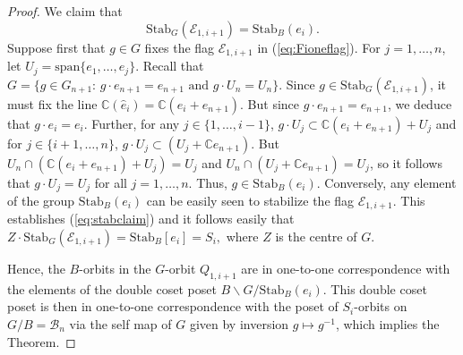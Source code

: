 \documentclass[12pt]{amsart}
\numberwithin{equation}{section}
\newcommand{\C}{\mbox{${\mathbb C}$}}
\newcommand{\B}{\mathcal{B}}
\newcommand{\F}{\mathcal{F}}
\begin{document}
\begin{proof}
We claim that 
\begin{equation}\label{eq:stabclaim}
\mbox{Stab}_{G}(\mathcal{E}_{1,i+1})=\mbox{Stab}_{B}(e_{i}).
\end{equation}
Suppose first that $g\in G$ fixes the flag $\mathcal{E}_{1,i+1}$ in (\ref{eq:Fioneflag}).  For $j=1,\dots, n$, let $U_{j}=\mbox{span}\{e_{1},\dots, e_{j}\}$.  Recall that $G=\{g\in G_{n+1}:\, g\cdot e_{n+1}=e_{n+1}\mbox{ and } g\cdot U_{n}=U_{n}\}.$  Since $g\in \mbox{Stab}_{G}(\mathcal{E}_{1,i+1})$, it must fix the line 
$\C(\hat{e}_{i})=\C(e_{i}+e_{n+1})$.  But since $g\cdot e_{n+1}=e_{n+1}$, we deduce that $g\cdot e_{i}=e_{i}.$
Further, for any $j\in\{1,\dots, i-1\}$, $g\cdot U_{j}\subset \C(e_{i}+e_{n+1})+U_{j}$ and 
for $j\in \{i+1,\dots, n\}$, $g\cdot U_{j}\subset (U_{j}+\C e_{n+1})$.  But $U_{n}\cap (\C(e_{i}+e_{n+1})+ U_{j})=U_{j}$ and $U_{n}\cap (U_{j}+\C e_{n+1})=U_{j}$, so it follows that $g\cdot U_{j}=U_{j}$ for all $j=1,\dots, n$.  Thus, $g\in \mbox{Stab}_{B}(e_{i})$.  Conversely, any element of the group $\mbox{Stab}_{B}(e_{i})$ can be easily seen to stabilize the flag $\mathcal{E}_{1,i+1}$.   This establishes (\ref{eq:stabclaim}) and it follows easily that $Z\cdot \mbox{Stab}_{G}(\mathcal{E}_{1,i+1})=\mbox{Stab}_{B}[e_{i}]=S_{i},$ where $Z$ is the centre of $G.$

Hence,  the $B$-orbits in the $G$-orbit $Q_{1,i+1}$ are in one-to-one correspondence with the elements of the double coset poset  $B\backslash G/ \mbox{Stab}_{B}(e_{i})$.  This double coset poset is then in one-to-one correspondence with the poset of $S_{i}$-orbits on $G/B=\B_{n}$ via the self map of $G$ given by inversion $g\mapsto g^{-1}$, which implies the Theorem.


\end{proof}
\end{document}
